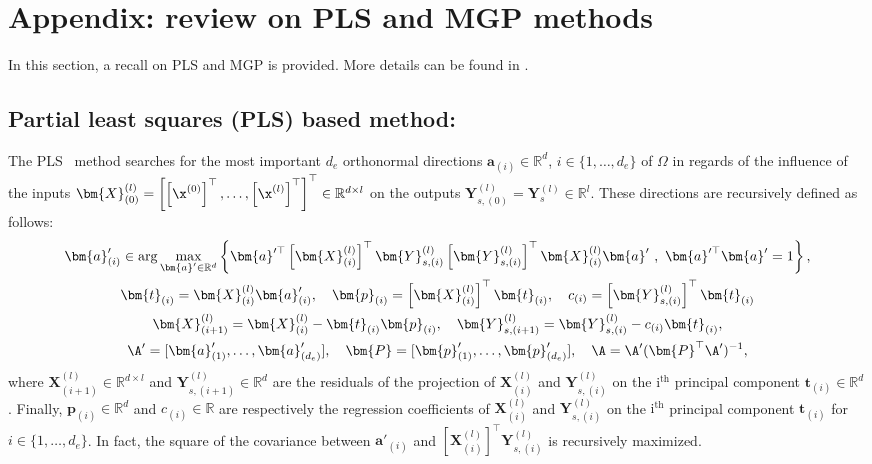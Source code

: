 \section{Appendix: review on PLS and MGP methods}

In this section, a recall on PLS and MGP is provided. More details can be found in \cite{hellandStructurePartialLeast1988,GarnettActiveLearningLinear2014}.

\subsection{Partial least squares (PLS) based method:}

The PLS~\cite{hellandStructurePartialLeast1988} method searches for the most important $d_e$ orthonormal directions $\bm{a}_{(i)} \in \mathbb{R}^d$, $i \in \{1,\ldots,d_e\}$ of $\Omega$ in regards of the influence of the inputs \mbox{$\bm{X}^{(l)}_{(0)} = \left[\left[\x^{(0)}\right]^\top,\ldots,\left[\x^{(l)}\right]^\top \right]^\top \in \mathbb{R}^{d \times l}$} on the outputs $\bm{Y}^{(l)}_{s,(0)} = \bm{Y}^{(l)}_s \in \mathbb{R}^l$.
These directions are recursively defined as follows: 
\begin{gather}
	\bm{a}'_{(i)} \in \arg \max_{\bm{a}' \in \mathbb{R}^d} \left\{ \bm{a}'^\top \left[\bm{X}^{(l)}_{(i)}\right]^\top \bm{Y}^{(l)}_{s,(i)} \left[\bm{Y}^{(l)}_{s,(i)}\right]^\top \bm{X}^{(l)}_{(i)} \bm{a}' \ , \ \bm{a}'^\top \bm{a}' = 1 \right\}, \label{eq:kpls_opt}\\
	\bm{t}_{(i)} = \bm{X}^{(l)}_{(i)} \bm{a}'_{(i)}, \quad
	\bm{p}_{(i)} = \left[\bm{X}^{(l)}_{(i)}\right]^\top \bm{t}_{(i)} , \quad c_{(i)} = \left[\bm{Y}^{(l)}_{s,(i)}\right]^\top \bm{t}_{(i)} \\ \bm{X}^{(l)}_{(i+1)} = \bm{X}^{(l)}_{(i)} - \bm{t}_{(i)} \bm{p}_{(i)}, \quad
	\bm{Y}^{(l)}_{s,(i+1)} = \bm{Y}^{(l)}_{s,(i)} - c_{(i)} \bm{t}_{(i)}, \\
	\A' = [\bm{a}'_{(1)},\ldots,\bm{a}'_{(d_e)}], \quad
	\bm{P} = [\bm{p}'_{(1)},\ldots,\bm{p}'_{(d_e)}], \quad
	\A = \A' (\bm{P}^\top \A')^{-1},
\end{gather}
where $\bm{X}^{(l)}_{(i+1)} \in \mathbb{R}^{d \times l}$ and $\bm{Y}^{(l)}_{s,(i+1)} \in \mathbb{R}^d$ are the residuals of the projection of $\bm{X}^{(l)}_{(i)}$ and $\bm{Y}^{(l)}_{s,(i)}$ on the $\text{i}^{\text{th}}$ principal component $\bm{t}_{(i)} \in \mathbb{R}^d$.
Finally, $\bm{p}_{(i)} \in \mathbb{R}^d$ and $c_{(i)} \in \mathbb{R}$ are respectively the regression coefficients of $\bm{X}^{(l)}_{(i)}$ and $\bm{Y}^{(l)}_{s,(i)}$ on the $\text{i}^{\text{th}}$ principal component $\bm{t}_{(i)}$ for $i \in \{1,\ldots,d_e\}$.
In fact, the square of the covariance between $\bm{a}'_{(i)}$ and $\left[\bm{X}^{(l)}_{(i)}\right]^\top \bm{Y}^{(l)}_{s,(i)}$ is recursively maximized.

